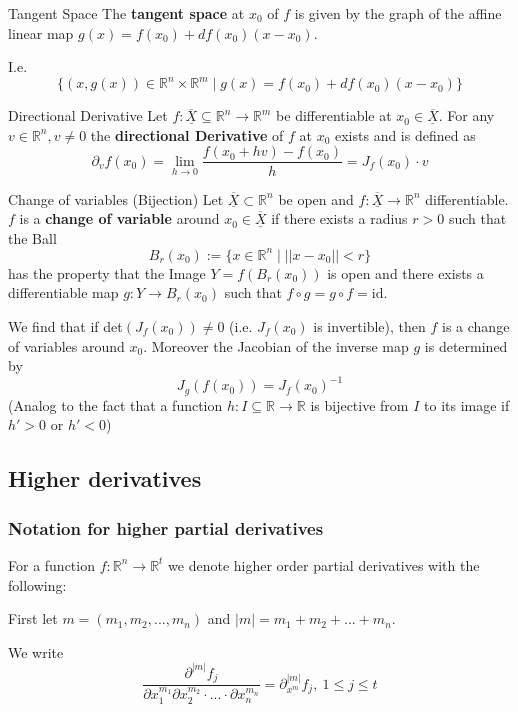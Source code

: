 \documentclass[a4paper,fontsize = 10pt]{article}
\def\R{\mathbb{R}}
\def\X{\underline{\overline{X}}}
\begin{document}
\begin{subbox}{Tangent Space}
  The \textbf{tangent space} at $x_0$ of \(f\) is given by the graph of the affine linear map \(g(x) = f(x_0) + df(x_0)(x-x_0)\).
  
  I.e. \[\{(x,g(x)) \in \R^n\times\R^m \mid g(x) = f(x_0) + df(x_0)(x-x_0)\}\]
\end{subbox}

\begin{subbox}{Directional Derivative}
    Let $f: \X \subseteq \R^n \to \R^m$ be differentiable at $x_0 \in \X$.
    For any $v \in \R^n, v \neq 0$ the \textbf{directional Derivative} of $f$ at $x_0$ exists and is defined as 
    \[\partial_v f(x_0) = \lim_{h \to 0} \frac{f(x_0 + hv)-f(x_0)}{h} = J_f(x_0) \cdot v\] 
\end{subbox}
\begin{mainbox}{Change of variables (Bijection)}
    Let $\X \subset \R^n$ be open and $f: \X \to \R^n$ differentiable. $f$ is a \textbf{change of variable} around $x_0 \in \X$ if there exists a radius $r > 0$ such that the Ball 
    \[B_r(x_0) := \{x \in \R^n \mid ||x-x_0|| < r\}\] 
    has the property that the Image $Y = f(B_r(x_0))$ is open and there exists a differentiable map $g: Y \to B_r(x_0)$ such that $f \circ g = g \circ f =\text{id}$.

    We find that if det\((J_f(x_0)) \neq 0\) (i.e. $J_f(x_0)$ is invertible), then $f$ is a change of variables around $x_0$. Moreover the Jacobian of the inverse map $g$ is determined by \[J_g(f(x_0)) = J_f(x_0)^{-1}\]
    (Analog to the fact that a function $h: I \subseteq \R \to \R$ is bijective from $I$ to its image if $h' > 0$ or $h' < 0$)
\end{mainbox}
\subsection{Higher derivatives}
\subsubsection*{Notation for higher partial derivatives}
    
For a function $f: \R^n \to \R^t$ we denote higher order partial derivatives with the following:

    First let $m = (m_1, m_2, ..., m_n)$ and $|m| = m_1 + m_2 + ... + m_n$.

    We write
    \[\frac{\partial^{|m|}f_j}{\partial x_1^{m_1} \partial x_2^{m_2} \cdot ... \cdot \partial x_n^{m_n}} = \partial_{x^m}^{|m|}f_j, \ 1 \leq j \leq t\]
\end{document}
